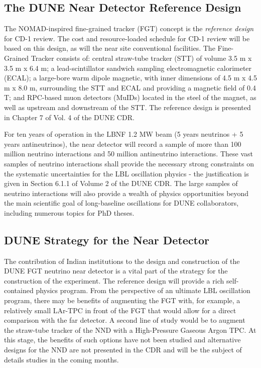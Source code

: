 \subsection{The DUNE Near Detector Reference Design }

The NOMAD-inspired fine-grained tracker (FGT) concept is the \textit{reference 
design} for CD-1 review. The cost and resource-loaded schedule for CD-1 review 
will be based on this design, as will the near site conventional facilities. The 
Fine-Grained Tracker consists of:  central straw-tube tracker (STT) of volume 3.5 
m x 3.5 m x 6.4 m; a lead-scintillator sandwich sampling electromagnetic calorimeter 
(ECAL); a large-bore warm dipole magnetic, with inner dimensions of 4.5 m x 4.5 
m x 8.0 m, surrounding the STT and ECAL and providing a magnetic field of 0.4 T; 
and RPC-based muon detectors (MuIDs) located in the steel of the magnet, as well 
as upstream and downstream of the STT. The reference design is presented in Chapter 
7 of Vol. 4 of the DUNE CDR. 

For ten years of operation in the LBNF 1.2 MW beam (5 years neutrinos + 5 years 
antineutrinos), the near detector will record a sample of more than 100 million 
neutrino interactions and 50 million antineutrino interactions. These vast samples 
of neutrino interactions shall provide the necessary strong constraints on the 
systematic uncertainties for the LBL oscillation physics - the justification is 
given in Section 6.1.1 of Volume 2 of the DUNE CDR. The large samples of neutrino 
interactions will also provide a wealth of physics opportunities beyond the main 
scientific goal of long-baseline oscillations for DUNE collaborators, including 
numerous topics for PhD theses.  

\subsection{DUNE Strategy for the Near Detector}

The contribution of Indian institutions to the design and construction of the DUNE 
FGT neutrino near detector is a vital part of the strategy for the construction 
of the experiment. The reference design will provide a rich self-contained physics 
program. From the perspective of an ultimate LBL oscillation program, there may 
be benefits of augmenting the FGT with, for example, a relatively small LAr-TPC 
in front of the FGT that would allow for a direct comparison with the far detector. 
A second line of study would be to augment the straw-tube tracker of the NND with 
a High-Pressure Gaseous Argon TPC. At this stage, the benefits of such options 
have not been studied and alternative designs for the NND are not presented in 
the CDR and will be the subject of details studies in the coming months. 

